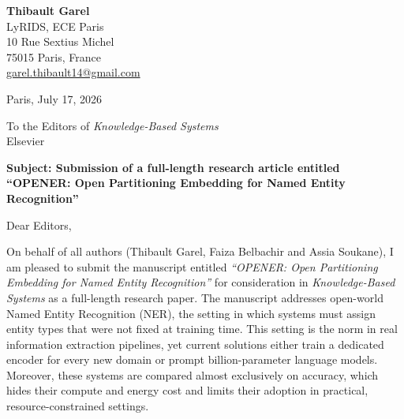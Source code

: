 \documentclass[11pt]{article}
\begin{document}
\enlargethispage{5\baselineskip}

\noindent
\begin{minipage}[t]{0.55\textwidth}
\textbf{Thibault Garel}\\
LyRIDS, ECE Paris\\
10 Rue Sextius Michel\\
75015 Paris, France\\
\href{mailto:garel.thibault14@gmail.com}{garel.thibault14@gmail.com}
\end{minipage}
\hfill
\begin{minipage}[t]{0.35\textwidth}
\raggedleft
Paris, July 17, 2026
\end{minipage}

\vspace{1.2em}

\noindent
To the Editors of \textit{Knowledge-Based Systems}\\
Elsevier

\vspace{0.7em}

\noindent
\textbf{Subject: Submission of a full-length research article entitled ``OPENER: Open Partitioning Embedding for Named Entity Recognition''}

\vspace{0.8em}

Dear Editors,

On behalf of all authors (Thibault Garel, Faiza Belbachir and Assia Soukane), I am pleased to submit the manuscript entitled \textit{``OPENER: Open Partitioning Embedding for Named Entity Recognition''} for consideration in \textit{Knowledge-Based Systems} as a full-length research paper.
The manuscript addresses open-world Named Entity Recognition (NER), the setting in which systems must assign entity types that were not fixed at training time.
This setting is the norm in real information extraction pipelines, yet current solutions either train a dedicated encoder for every new domain or prompt billion-parameter language models.
Moreover, these systems are compared almost exclusively on accuracy, which hides their compute and energy cost and limits their adoption in practical, resource-constrained settings.
\end{document}
